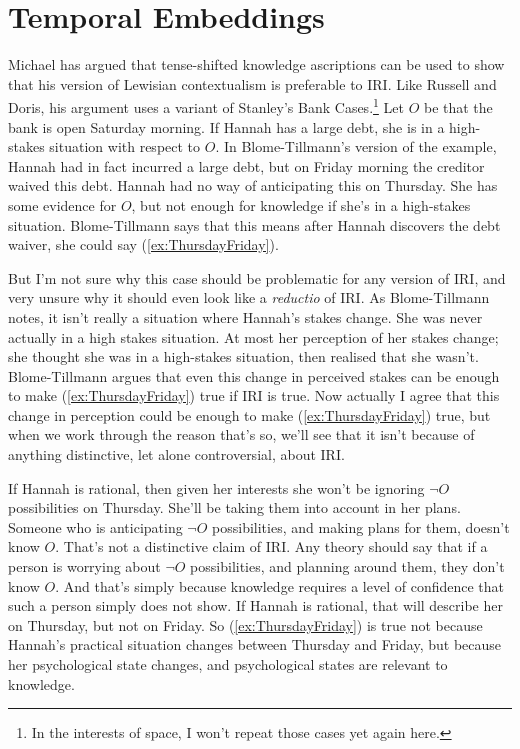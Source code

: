 \section{Temporal Embeddings} \label{sect:time}

Michael \citet{MBT2009} has argued that tense-shifted knowledge ascriptions can be used to show that his version of Lewisian contextualism is preferable to IRI. Like Russell and Doris, his argument uses a variant of Stanley's Bank Cases.\footnote{In the interests of space, I won't repeat those cases yet again here.} Let $O$ be that the bank is open Saturday morning. If Hannah has a large debt, she is in a high-stakes situation with respect to $O$. In Blome-Tillmann's version of the example, Hannah had in fact incurred a large debt, but on Friday morning the creditor waived this debt. Hannah had no way of anticipating this on Thursday. She has some evidence for $O$, but not enough for knowledge if she's in a high-stakes situation. Blome-Tillmann says that this means after Hannah discovers the debt waiver, she could say (\ref{ex:ThursdayFriday}).


\noindent But I'm not sure why this case should be problematic for any version of IRI, and very unsure why it should even look like a \textit{reductio} of IRI. As Blome-Tillmann notes, it isn't really a situation where Hannah's stakes change. She was never actually in a high stakes situation. At most her perception of her stakes change; she thought she was in a high-stakes situation, then realised that she wasn't. Blome-Tillmann argues that even this change in perceived stakes can be enough to make (\ref{ex:ThursdayFriday}) true if IRI is true. Now actually I agree that this change in perception could be enough to make (\ref{ex:ThursdayFriday}) true, but when we work through the reason that's so, we'll see that it isn't because of anything distinctive, let alone controversial, about IRI.

If Hannah is rational, then given her interests she won't be ignoring $\neg O$ possibilities on Thursday. She'll be taking them into account in her plans. Someone who is anticipating $\neg O$ possibilities, and making plans for them, doesn't know $O$. That's not a distinctive claim of IRI. Any theory should say that if a person is worrying about $\neg O$ possibilities, and planning around them, they don't know $O$. And that's simply because knowledge requires a level of confidence that such a person simply does not show. If Hannah is rational, that will describe her on Thursday, but not on Friday. So (\ref{ex:ThursdayFriday}) is true not because Hannah's practical situation changes between Thursday and Friday, but because her psychological state changes, and psychological states are relevant to knowledge.

